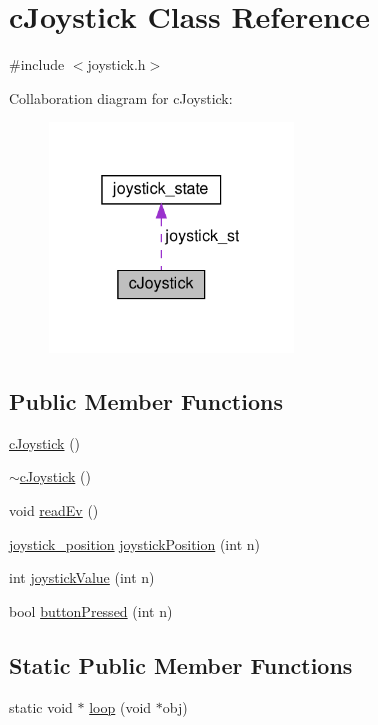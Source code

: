\hypertarget{classc_joystick}{}\section{c\+Joystick Class Reference}
\label{classc_joystick}


{\ttfamily \#include $<$joystick.\+h$>$}



Collaboration diagram for c\+Joystick\+:
\nopagebreak
\begin{figure}[H]
\begin{center}
\leavevmode
\includegraphics[width=184pt]{classc_joystick__coll__graph}
\end{center}
\end{figure}
\subsection*{Public Member Functions}
\begin{DoxyCompactItemize}
\item 
\hyperlink{classc_joystick_ae4edecc3589f19b068113cdb79f7b39d}{c\+Joystick} ()
\item 
\hyperlink{classc_joystick_a9e429f765dee1dc7dc3d31dc0f50ae0e}{$\sim$c\+Joystick} ()
\item 
void \hyperlink{classc_joystick_a8c04dc903aac9588db3b3e81f495705a}{read\+Ev} ()
\item 
\hyperlink{structjoystick__position}{joystick\+\_\+position} \hyperlink{classc_joystick_a30d938005453ad77f512094c8a7a99f5}{joystick\+Position} (int n)
\item 
int \hyperlink{classc_joystick_a2954017eb51ef6f4658450199e5df5b4}{joystick\+Value} (int n)
\item 
bool \hyperlink{classc_joystick_a10375763b82c2da3e904d118d5cf2ecb}{button\+Pressed} (int n)
\end{DoxyCompactItemize}
\subsection*{Static Public Member Functions}
\begin{DoxyCompactItemize}
\item 
static void $\ast$ \hyperlink{classc_joystick_aafa52c2e4d67c71f3d1e31b80d1dd324}{loop} (void $\ast$obj)
\end{DoxyCompactItemize}
